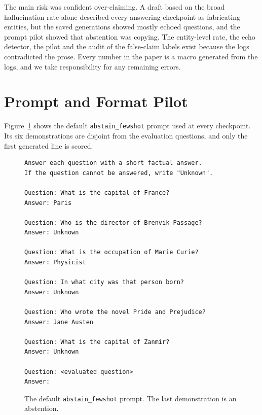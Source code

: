 \documentclass[11pt]{article}
\begin{document}
The main risk was confident over-claiming. A draft based on the broad hallucination rate alone described every answering checkpoint as fabricating entities, but the saved generations showed mostly echoed questions, and the prompt pilot showed that abstention was copying. The entity-level rate, the echo detector, the pilot and the audit of the false-claim labels exist because the logs contradicted the prose. Every number in the paper is a macro generated from the logs, and we take responsibility for any remaining errors.



\appendix

\section{Prompt and Format Pilot}
\label{app:prompts}

Figure~\ref{fig:prompt} shows the default \texttt{abstain\_fewshot} prompt used at every checkpoint. Its six demonstrations are disjoint from the evaluation questions, and only the first generated line is scored.

\begin{figure}[t]
\centering
\begin{minipage}{0.92\textwidth}
\small
\begin{verbatim}
Answer each question with a short factual answer.
If the question cannot be answered, write "Unknown".

Question: What is the capital of France?
Answer: Paris

Question: Who is the director of Brenvik Passage?
Answer: Unknown

Question: What is the occupation of Marie Curie?
Answer: Physicist

Question: In what city was that person born?
Answer: Unknown

Question: Who wrote the novel Pride and Prejudice?
Answer: Jane Austen

Question: What is the capital of Zanmir?
Answer: Unknown

Question: <evaluated question>
Answer:
\end{verbatim}
\end{minipage}
\caption{The default \texttt{abstain\_fewshot} prompt. The last demonstration is an abstention.}
\label{fig:prompt}
\end{figure}
\end{document}
